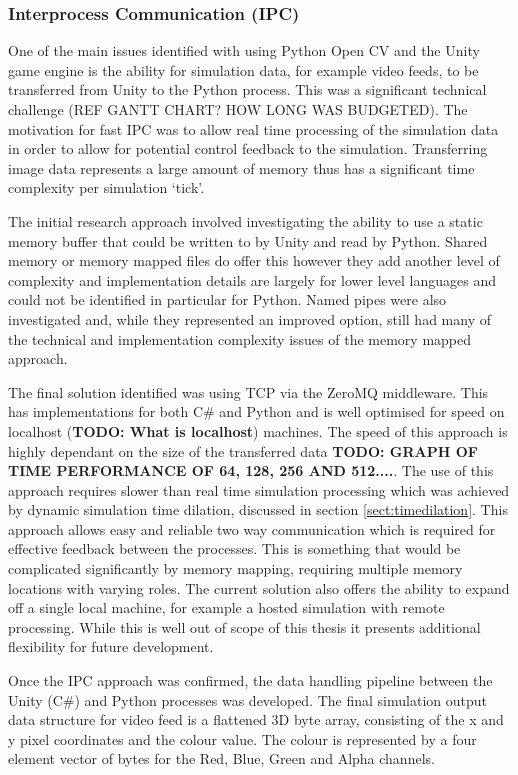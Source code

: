 \documentclass[]{aiaa-tc}%
\begin{document}
\subsubsection{Interprocess Communication (IPC)} \label{s:IPC}

One of the main issues identified with using Python Open CV and the Unity game engine is the ability for simulation data, for example video feeds, to be transferred from Unity to the Python process. This was a significant technical challenge (REF GANTT CHART? HOW LONG WAS BUDGETED). The motivation for fast IPC was to allow real time processing of the simulation data in order to allow for potential control feedback to the simulation. Transferring image data represents a large amount of memory thus has a significant time complexity per simulation `tick'. 

The initial research approach involved investigating the ability to use a static memory buffer that could be written to by Unity and read by Python. Shared memory or memory mapped files do offer this however they add another level of complexity and implementation details are largely for lower level languages and could not be identified in particular for Python. Named pipes were also investigated and, while they represented an improved option, still had many of the technical and implementation complexity issues of the memory mapped approach.

The final solution identified was using TCP via the ZeroMQ middleware. This has implementations for both C\# and Python and is well optimised for speed on localhost (\textbf{TODO: What is localhost}) machines. The speed of this approach is highly dependant on the size of the transferred data \textbf{TODO: GRAPH OF TIME PERFORMANCE OF 64, 128, 256 AND 512....}. The use of this approach requires slower than real time simulation processing which was achieved by dynamic simulation time dilation, discussed in section \ref{sect:timedilation}. This approach allows easy and reliable two way communication which is required for effective feedback between the processes. This is something that would be complicated significantly by memory mapping, requiring multiple memory locations with varying roles. The current solution also offers the ability to expand off a single local machine, for example a hosted simulation with remote processing. While this is well out of scope of this thesis it presents additional flexibility for future development.

Once the IPC approach was confirmed, the data handling pipeline between the Unity (C\#) and Python processes was developed. The final simulation output data structure for video feed is a flattened 3D byte array, consisting of the x and y pixel coordinates and the colour value. The colour is represented by a four element vector of bytes for the Red, Blue, Green and Alpha channels. 
\end{document}
